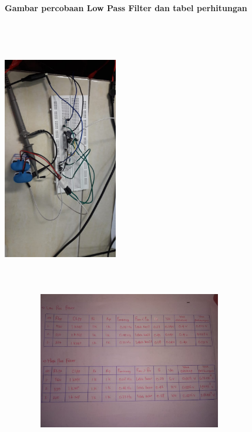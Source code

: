 \documentclass[12pt,a4paper]{article}
\begin{document}
\newpage
\begin{figure}
\paragraph{Gambar percobaan Low Pass Filter dan tabel perhitungan}
\paragraph{ }
\begin{center}

\includegraphics[width=5cm, height=12cm]{LPF1.png}

\includegraphics[width=12cm, height=6cm]{Hitung3.png}

\end{center}
\end{figure}
\vspace{2cm}
\end{document}
